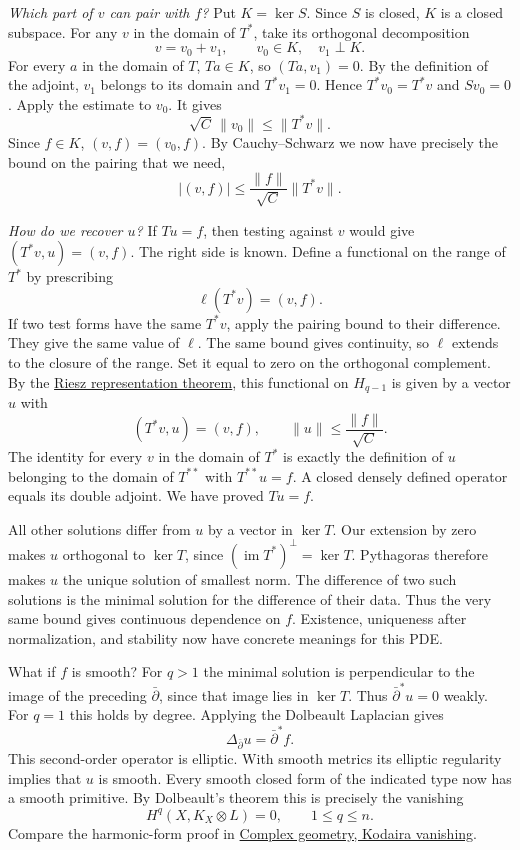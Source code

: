 \emph{Which part of $v$ can pair with
$f$?} Put $K=\ker S$. Since $S$ is
closed, $K$ is a closed subspace. For
any $v$ in the domain of $T^*$, take
its orthogonal decomposition
$$
v=v_0+v_1,\qquad v_0\in K,\quad v_1\perp K.
$$
For every $a$ in the domain of $T$,
$Ta\in K$, so $(Ta,v_1)=0$. By the
definition of the adjoint, $v_1$ belongs
to its domain and $T^*v_1=0$. Hence
$T^*v_0=T^*v$ and $Sv_0=0$. Apply the
estimate to $v_0$. It gives
$$
\sqrt C\,\|v_0\|\le\|T^*v\|.
$$
Since $f\in K$, $(v,f)=(v_0,f)$. By
Cauchy--Schwarz we now have precisely the
bound on the pairing that we need,
$$
|(v,f)|\le
\frac{\|f\|}{\sqrt C}\|T^*v\|.
$$

\emph{How do we recover $u$?} If $Tu=f$,
then testing against $v$ would give
$(T^*v,u)=(v,f)$. The right side is known.
Define a functional on the range of $T^*$
by prescribing
$$
\ell(T^*v)=(v,f).
$$
If two test forms have the same $T^*v$,
apply the pairing bound to their
difference. They give the same value of
$\ell$. The same bound gives continuity,
so $\ell$ extends to the closure of the
range. Set it equal to zero on the
orthogonal complement. By the
\href{https://www.heap-project.org/tag/0562}
{Riesz representation theorem}, this
functional on $H_{q-1}$ is given by a
vector $u$ with
$$
(T^*v,u)=(v,f),\qquad
\|u\|\le\frac{\|f\|}{\sqrt C}.
$$
The identity for every $v$ in the domain
of $T^*$ is exactly the definition of
$u$ belonging to the domain of $T^{**}$
with $T^{**}u=f$. A closed densely
defined operator equals its double
adjoint. We have proved $Tu=f$.

All other solutions differ from $u$ by a
vector in $\ker T$. Our extension by zero
makes $u$ orthogonal to $\ker T$, since
$(\operatorname{im}T^*)^\perp=\ker T$.
Pythagoras therefore makes $u$ the unique
solution of smallest norm. The difference
of two such solutions is the minimal
solution for the difference of their data.
Thus the very same bound gives continuous
dependence on $f$. Existence, uniqueness
after normalization, and stability now
have concrete meanings for this PDE.

What if $f$ is smooth? For $q>1$ the
minimal solution is perpendicular to the
image of the preceding $\bar\partial$,
since that image lies in $\ker T$.
Thus $\bar\partial^*u=0$ weakly. For $q=1$
this holds by degree. Applying the
Dolbeault Laplacian gives
$$
\Delta_{\bar\partial}u
=\bar\partial^*f.
$$
This second-order operator is elliptic.
With smooth metrics its elliptic regularity
implies that $u$ is smooth. Every smooth
closed form of the indicated type now has
a smooth primitive. By Dolbeault's theorem
this is precisely the vanishing
$$
H^q(X,K_X\otimes L)=0,\qquad 1\le q\le n.
$$
Compare the harmonic-form proof in
\href{https://www.heap-project.org/tag/066P}
{Complex geometry, Kodaira vanishing}.

